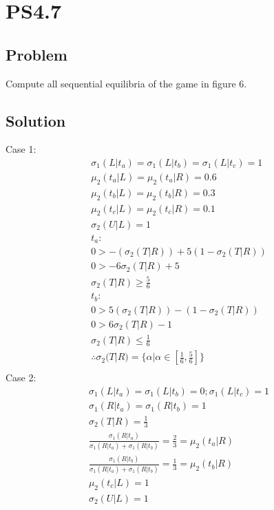 \documentclass[10pt, a4paper]{article}
\begin{document}
  \section*{PS4.7}
    \subsection*{Problem}
      Compute all sequential equilibria of the game in figure 6.
    \subsection*{Solution}
      Case 1: 
      \begin{gather*}
        \sigma_1(L|t_a)=\sigma_1(L|t_b)=\sigma_1(L|t_c)=1 \\
        \mu_2(t_a|L) = \mu_2(t_a|R) = 0.6 \\
        \mu_2(t_b|L) = \mu_2(t_b|R) = 0.3 \\
        \mu_2(t_c|L) = \mu_2(t_c|R) = 0.1 \\
        \sigma_2(U|L) = 1 \\
        t_a: \\
        0 > -(\sigma_2(T|R)) + 5(1-\sigma_2(T|R)) \\
        0 > -6\sigma_2(T|R) + 5 \\
        \sigma_2(T|R) \geq \frac{5}{6} \\
        t_b: \\
        0 > 5(\sigma_2(T|R)) - (1-\sigma_2(T|R)) \\
        0 > 6\sigma_2(T|R) - 1 \\
        \sigma_2(T|R) \leq \frac{1}{6} \\
        \therefore \sigma_2(T|R) = \{\alpha|\alpha\in[\frac{1}{6}, \frac{5}{6}]\} \\
      \end{gather*}
      Case 2:
      \begin{gather*}
        \sigma_1(L|t_a) = \sigma_1(L|t_b) = 0; \sigma_1(L|t_c) = 1 \\
        \sigma_1(R|t_a) = \sigma_1(R|t_b) = 1 \\
        \sigma_2(T|R) = \frac{1}{3} \\
        \frac{\sigma_1(R|t_a)}{\sigma_1(R|t_a)+\sigma_1(R|t_b)} = \frac{2}{3} = \mu_2(t_a|R)\\
        \frac{\sigma_1(R|t_b)}{\sigma_1(R|t_a)+\sigma_1(R|t_b)} = \frac{1}{3} = \mu_2(t_b|R) \\
        \mu_2(t_c|L) = 1 \\
        \sigma_2(U|L) = 1 \\
      \end{gather*}
\end{document}
